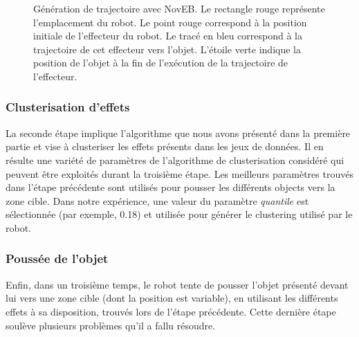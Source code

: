 \documentclass{llncs}
\begin{document}
\begin{figure}[!tbp]
\begin{minipage}[b]{0.45\textwidth}
    \caption{Génération de trajectoire avec NovEB. Le rectangle rouge représente l'emplacement du robot. Le point rouge correspond à la position initiale de l'effecteur du robot. Le tracé en bleu correspond à la trajectoire de cet effecteur vers l'objet. L'étoile verte indique la position de l'objet à la fin de l'exécution de la trajectoire de l'effecteur.}
    \label{fig:ns_traj}
  \end{minipage}
\end{figure}


\subsubsection{Clusterisation d'effets}
La seconde étape implique l'algorithme que nous avons présenté dans la première partie et vise à clusteriser les effets présents dans les jeux de données. Il en résulte une variété de paramètres de l'algorithme de clusterisation considéré qui peuvent être exploités durant la troisième étape.
Les meilleurs paramètres trouvés dans l'étape précédente sont utilisés pour pousser les différents objects vers la zone cible. Dans notre expérience, une valeur du paramètre \textit{quantile} est sélectionnée (par exemple, 0.18) et utilisée pour générer le clustering utilisé par le robot.


\subsubsection{Poussée de l'objet}
Enfin, dans un troisième temps, le robot tente de pousser l'objet présenté devant lui vers une zone cible (dont la position est variable), en utilisant les différents effets à sa disposition, trouvés lors de l'étape précédente. Cette dernière étape soulève plusieurs problèmes qu'il a fallu résoudre. 
\end{document}
